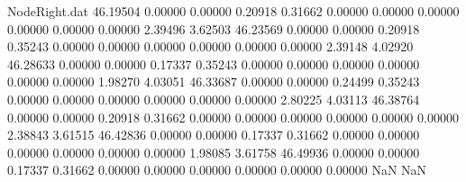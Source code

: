 \begin{filecontents}{NodeRight.dat}
  46.19504    0.00000    0.00000     0.20918    0.31662    0.00000    0.00000    0.00000    0.00000    0.00000    0.00000    2.39496    3.62503
  46.23569    0.00000    0.00000     0.20918    0.35243    0.00000    0.00000    0.00000    0.00000    0.00000    0.00000    2.39148    4.02920
  46.28633    0.00000    0.00000     0.17337    0.35243    0.00000    0.00000    0.00000    0.00000    0.00000    0.00000    1.98270    4.03051
  46.33687    0.00000    0.00000     0.24499    0.35243    0.00000    0.00000    0.00000    0.00000    0.00000    0.00000    2.80225    4.03113
  46.38764    0.00000    0.00000     0.20918    0.31662    0.00000    0.00000    0.00000    0.00000    0.00000    0.00000    2.38843    3.61515
  46.42836    0.00000    0.00000     0.17337    0.31662    0.00000    0.00000    0.00000    0.00000    0.00000    0.00000    1.98085    3.61758
  46.49936    0.00000    0.00000     0.17337    0.31662    0.00000    0.00000    0.00000    0.00000    0.00000    0.00000        NaN        NaN
\end{filecontents}
